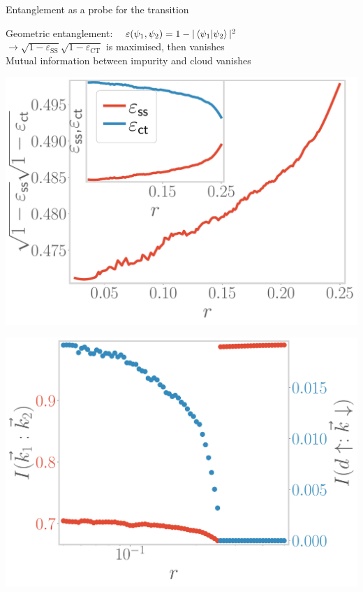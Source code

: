 \documentclass[8pt,aspectratio=169]{beamer}
\begin{document}
\begin{frame}{Entanglement as a probe for the transition}

	Geometric entanglement: ~ \(\varepsilon(\psi_1,\psi_2) = 1 - |\braket{\psi_1|\psi_2}|^2\)\\[10pt]
	\(\longrightarrow \sqrt{1 -\varepsilon_\text{SS}}\sqrt{1 -\varepsilon_\text{CT}}\) is maximised, then vanishes\\[10pt]
	Mutual information between impurity and cloud vanishes\\[10pt]

\begin{minipage}{0.49\textwidth}
	\includegraphics[width=\textwidth]{entanglement.pdf}
\end{minipage}
\hspace*{\fill}
\begin{minipage}{0.49\textwidth}
	\includegraphics[width=\textwidth]{I_k.pdf}
\end{minipage}

\end{frame}
\end{document}
